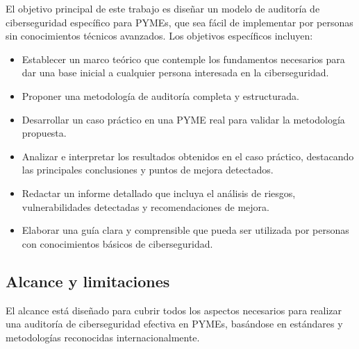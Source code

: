 \documentclass[a4paper, 11pt]{article}
\begin{document}
El objetivo principal de este trabajo es diseñar un modelo de auditoría de ciberseguridad específico para PYMEs, que sea fácil de implementar por personas sin conocimientos técnicos avanzados. Los objetivos específicos incluyen:

\begin{itemize}
    \item Establecer un marco teórico que contemple los fundamentos necesarios para dar una base inicial a cualquier persona interesada en la ciberseguridad.
    \item Proponer una metodología de auditoría completa y estructurada.
    \item Desarrollar un caso práctico en una PYME real para validar la metodología propuesta.
    \item Analizar e interpretar los resultados obtenidos en el caso práctico, destacando las principales conclusiones y puntos de mejora detectados.

    \item Redactar un informe detallado que incluya el análisis de riesgos, vulnerabilidades detectadas y recomendaciones de mejora.
    \item Elaborar una guía clara y comprensible que pueda ser utilizada por personas con conocimientos básicos de ciberseguridad.
\end{itemize}

\subsection{Alcance y limitaciones}


El alcance está diseñado para cubrir todos los aspectos necesarios para realizar una auditoría de ciberseguridad efectiva en PYMEs, basándose en estándares y metodologías reconocidas internacionalmente.
\end{document}
